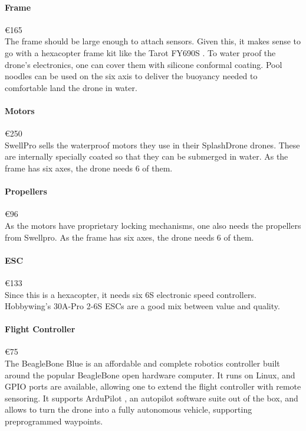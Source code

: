 \paragraph{Frame}\mbox{€165} \\
The frame should be large enough to attach sensors. Given this, it makes sense to go with a hexacopter frame kit like the Tarot FY690S \cite{fy690s}. To water proof the drone's electronics, one can cover them with silicone conformal coating. \cite{conformalcoating} Pool noodles \cite{air2slandinggear} can be used on the six axis to deliver the buoyancy needed to comfortable land the drone in water.

\paragraph{Motors}\mbox{€250} \\
SwellPro sells the waterproof motors they use in their SplashDrone drones. \cite{swellpromotor} These are internally specially coated so that they can be submerged in water. As the frame has six axes, the drone needs 6 of them.

\paragraph{Propellers}\mbox{€96} \\
As the motors have proprietary locking mechanisms, one also needs the propellers from Swellpro.\cite{swellpromotor} As the frame has six axes, the drone needs 6 of them.

\paragraph{ESC}\mbox{€133} \\
Since this is a hexacopter, it needs six 6S electronic speed controllers. Hobbywing's 30A-Pro 2-6S ESCs are a good mix between value and quality. \cite{hobbywingesc}

\paragraph{Flight Controller}\mbox{€75} \\
The BeagleBone Blue \cite{bblue} is an affordable and complete robotics controller built around the popular BeagleBone open hardware computer. It runs on Linux, and GPIO ports are available, allowing one to extend the flight controller with remote sensoring. It supports ArduPilot \cite{ardupilot}, an autopilot software suite out of the box, and allows to turn the drone into a fully autonomous vehicle, supporting preprogrammed waypoints.

